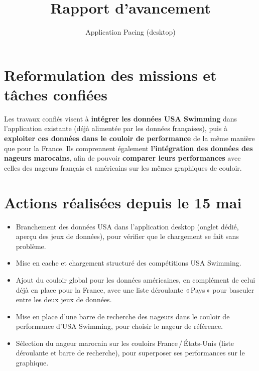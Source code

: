 \documentclass[11pt,a4paper]{article}
\title{Rapport d'avancement}
\author{Application Pacing (desktop)}
\begin{document}
\maketitle
\thispagestyle{empty}
\vspace{-1.5em}

\section{Reformulation des missions et tâches confiées}

Les travaux confiés visent à \textbf{intégrer les données USA Swimming} dans l'application existante (déjà alimentée par les données françaises), puis à \textbf{exploiter ces données dans le couloir de performance} de la même manière que pour la France. Ils comprennent également \textbf{l'intégration des données des nageurs marocains}, afin de pouvoir \textbf{comparer leurs performances} avec celles des nageurs français et américains sur les mêmes graphiques de couloir.

\section{Actions réalisées depuis le 15 mai}

\begin{itemize}
  \item Branchement des données USA dans l'application desktop (onglet dédié, aperçu des jeux de données), pour vérifier que le chargement se fait sans problème.
  \item Mise en cache et chargement structuré des compétitions USA Swimming.
  \item Ajout du couloir global pour les données américaines, en complément de celui déjà en place pour la France, avec une liste déroulante «\,Pays\,» pour basculer entre les deux jeux de données.
  \item Mise en place d'une barre de recherche des nageurs dans le couloir de performance d'USA Swimming, pour choisir le nageur de référence.
  \item Sélection du nageur marocain sur les couloirs France\,/\,États-Unis (liste déroulante et barre de recherche), pour superposer ses performances sur le graphique.
\end{itemize}
\end{document}
